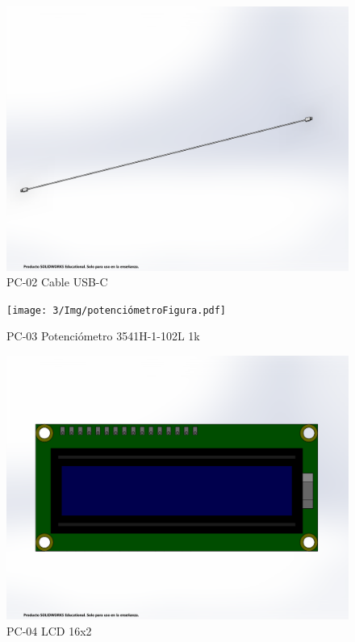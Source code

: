     \begin{figure}[H]
        \centering
        \includegraphics[trim = {1mm 50mm 1mm 60mm},clip,scale=0.2]{3/Img/cableUSB-CFigura.pdf}
        \caption{PC-02 Cable USB-C}
        \label{fig:cableUSB-CFigura}
    \end{figure}
    \begin{figure}[H]
        \centering
        \texttt{[image: 3/Img/potenciómetroFigura.pdf]}
        \caption{PC-03 Potenciómetro 3541H-1-102L 1k}
        \label{fig:potenciómetroFigura}
    \end{figure}
    \begin{figure}[H]
        \centering
        \includegraphics[trim = {1mm 20mm 1mm 20mm},clip,scale=0.2]{3/Img/lcdFigura.pdf}
        \caption{PC-04 LCD 16x2}
        \label{fig:lcdFigura}
    \end{figure}
